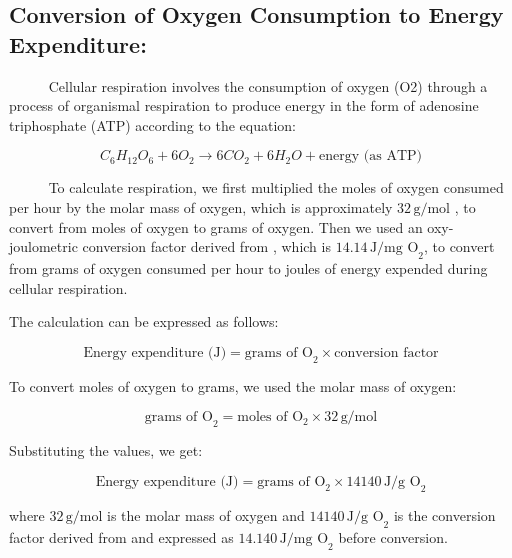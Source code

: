 \documentclass[
  12pt,
]{article}
\begin{document}
\subsection*{Conversion of Oxygen Consumption to Energy Expenditure:}

~~~~~ Cellular respiration involves the consumption of oxygen (O2)
through a process of organismal respiration to produce energy in the
form of adenosine triphosphate (ATP) \cite{babcock1992oxygen} according
to the equation:

\[
C_6H_{12}O_6 + 6O_2 \rightarrow 6CO_2 + 6H_2O + \text{energy (as ATP)}
\]

~~~~~ To calculate respiration, we first multiplied the moles of oxygen
consumed per hour by the molar mass of oxygen, which is approximately
\(32 \, \text{g/mol}\) \citep{hochachka1983protons}, to convert from
moles of oxygen to grams of oxygen. Then we used an oxy-joulometric
conversion factor derived from \cite{elliott1975energy}, which is
\(14.14 \, \text{J/mg O}_2\), to convert from grams of oxygen consumed
per hour to joules of energy expended during cellular respiration.

The calculation can be expressed as follows:

\[
\text{Energy expenditure (J)} = \text{grams of O}_2 \times \text{conversion factor}
\]

To convert moles of oxygen to grams, we used the molar mass of oxygen:

\[
\text{grams of O}_2 = \text{moles of O}_2 \times 32 \, \text{g/mol}
\]

Substituting the values, we get:

\[
\text{Energy expenditure (J)} = \text{grams of O}_2 \times 14140 \, \text{J/g O}_2
\]

where \(32 \, \text{g/mol}\) is the molar mass of oxygen and
\(14140 \, \text{J/g O}_2\) is the conversion factor derived from
\cite{elliott1975energy} and expressed as \(14.140 \, \text{J/mg O}_2\)
before conversion.
\end{document}

